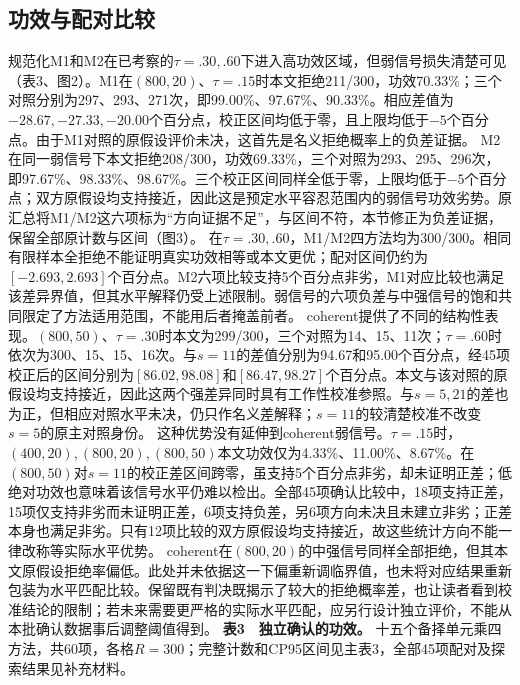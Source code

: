 \subsection{功效与配对比较}
规范化M1和M2在已考察的$\tau=.30,.60$下进入高功效区域，但弱信号损失清楚可见（表3、图2）。M1在$(800,20)$、$\tau=.15$时本文拒绝211/300，功效70.33\%；三个对照分别为297、293、271次，即99.00\%、97.67\%、90.33\%。相应差值为$-28.67,-27.33,-20.00$个百分点，校正区间均低于零，且上限均低于$-5$个百分点。由于M1对照的原假设评价未决，这首先是名义拒绝概率上的负差证据。
M2在同一弱信号下本文拒绝208/300，功效69.33\%，三个对照为293、295、296次，即97.67\%、98.33\%、98.67\%。三个校正区间同样全低于零，上限均低于$-5$个百分点；双方原假设均支持接近，因此这是预定水平容忍范围内的弱信号功效劣势。原汇总将M1/M2这六项标为“方向证据不足”，与区间不符，本节修正为负差证据，保留全部原计数与区间（图3）。
在$\tau=.30,.60$，M1/M2四方法均为300/300。相同有限样本全拒绝不能证明真实功效相等或本文更优；配对区间仍约为$[-2.693,2.693]$个百分点。M2六项比较支持5个百分点非劣，M1对应比较也满足该差异界值，但其水平解释仍受上述限制。弱信号的六项负差与中强信号的饱和共同限定了方法适用范围，不能用后者掩盖前者。
coherent提供了不同的结构性表现。$(800,50)$、$\tau=.30$时本文为299/300，三个对照为14、15、11次；$\tau=.60$时依次为300、15、15、16次。与$s=11$的差值分别为94.67和95.00个百分点，经45项校正后的区间分别为$[86.02,98.08]$和$[86.47,98.27]$个百分点。本文与该对照的原假设均支持接近，因此这两个强差异同时具有工作性校准参照。与$s=5,21$的差也为正，但相应对照水平未决，仍只作名义差解释；$s=11$的较清楚校准不改变$s=5$的原主对照身份。
这种优势没有延伸到coherent弱信号。$\tau=.15$时，$(400,20),(800,20),(800,50)$本文功效仅为4.33\%、11.00\%、8.67\%。在$(800,50)$对$s=11$的校正差区间跨零，虽支持5个百分点非劣，却未证明正差；低绝对功效也意味着该信号水平仍难以检出。全部45项确认比较中，18项支持正差，15项仅支持非劣而未证明正差，6项支持负差，另6项方向未决且未建立非劣；正差本身也满足非劣。只有12项比较的双方原假设均支持接近，故这些统计方向不能一律改称等实际水平优势。
coherent在$(800,20)$的中强信号同样全部拒绝，但其本文原假设拒绝率偏低。此处并未依据这一下偏重新调临界值，也未将对应结果重新包装为水平匹配比较。保留既有判决既揭示了较大的拒绝概率差，也让读者看到校准结论的限制；若未来需要更严格的实际水平匹配，应另行设计独立评价，不能从本批确认数据事后调整阈值得到。
\textbf{表3　独立确认的功效。} 十五个备择单元乘四方法，共60项，各格$R=300$；完整计数和CP95区间见主表3，全部45项配对及探索结果见补充材料。

